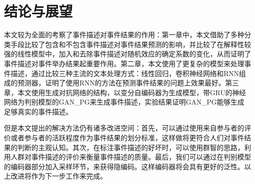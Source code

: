 % 
\section{结论与展望}
本文较为全面的考察了事件描述对事件结果的作用：第一章中，本文借助了多种分类手段比较了包含和不包含事件描述对事件结果预测的影响，并比较了在解释性较强的线性模型中，加入和去除事件描述对随机效应的确定系数的变化，从而证明了事件描述对事件举办结果起重要作用。第二章，本文使用了更复杂的模型来处理事件描述，通过比较三种主流的文本处理方式：线性回归，卷积神经网络和RNN组成的预测器，证明了使用RNN的方法在预测事件结果的问题上效果最好。第三章，本文使用生成对抗网络的结构，以变分自编码器为生成模型，带GRU的神经网络为判别模型的GAN\_PG来生成事件描述，实验结果证明GAN\_PG能够生成足够真实的事件描述。

但是本文提出的解决方法仍有诸多改进空间：首先，可以通过使用来自参与者的评价或者参与者的活跃程度作为事件结果的划分标准，这样做将更符合人们对事件结果的判断的主观认知。其次，在标注事件描述的好坏时，可以使用群智的思路，利用人群对事件描述的评价来衡量事件描述的质量。最后，我们可以通过在判别模型的编码器部分加入采样环节，来获得隐编码。这样编码器将会具有更好的泛性。以上改进将作为下一步工作来完成。
% 